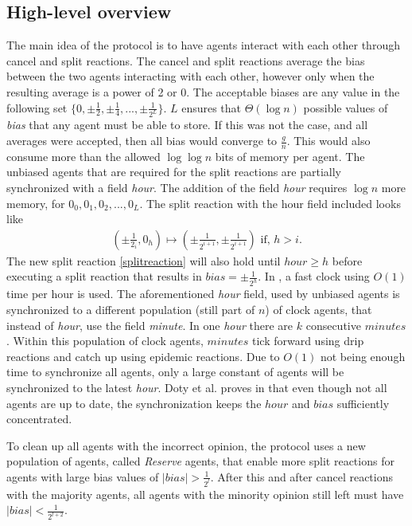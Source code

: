 \subsection{High-level overview}

The main idea of the protocol is to have agents interact with each other through cancel and split reactions. The cancel and split reactions average the bias between the two agents interacting with each other, however only when the resulting average is a power of 2 or 0. The acceptable biases are any value in the following set $\{ 0, \pm \frac{1}{2}, \pm \frac{1}{4}, ...,  \pm \frac{1}{2^L} \}$. $L$ ensures that $\Theta(\log n)$ possible values of \emph{bias} that any agent must be able to store. If this was not the case, and all averages were accepted, then all bias would converge to $\frac{g}{n}$. This would also consume more than the allowed $\log \log n$ bits of memory per agent. The unbiased agents that are required for the split reactions are partially synchronized with a field \emph{hour}. The addition of the field \emph{hour} requires $\log n$ more memory, for $0_0, 0_1, 0_2, ..., 0_L$. The split reaction with the hour field included looks like
\begin{align}
    (\pm \frac{1}{2_i}, 0_h) \mapsto (\pm \frac{1}{2^{i + 1}}, \pm \frac{1}{2^{i + 1}}) \text{      if, } h > i.  \label{splitreaction}
\end{align}
The new split reaction \ref{splitreaction} will also hold until $hour \geq h$ before executing a split reaction that results in $bias = \pm \frac{1}{2^h}$. In \cite{dotyTimeSpaceOptimal2022}, a fast clock using $O(1)$ time per hour is used. The aforementioned \emph{hour} field, used by unbiased agents is synchronized to a different population (still part of $n$) of clock agents, that instead of \emph{hour}, use the field \emph{minute}. In one \emph{hour} there are $k$ consecutive $minutes$. Within this population of clock agents, $minutes$ tick forward using drip reactions and catch up using epidemic reactions. Due to $O(1)$ not being enough time to synchronize all agents, only a large constant of agents will be synchronized to the latest \emph{hour}. Doty et al. proves in \cite{dotyTimeSpaceOptimal2022} that even though not all agents are up to date, the synchronization keeps the $hour$ and $bias$ sufficiently concentrated.

To clean up all agents with the incorrect opinion, the protocol uses a new population of agents, called \emph{Reserve} agents, that enable more split reactions for agents with large bias values of $|bias| > \frac{1}{2^l}$. After this and after cancel reactions with the majority agents, all agents with the minority opinion still left must have $|bias| < \frac{1}{2^{l + 2}}$. 

